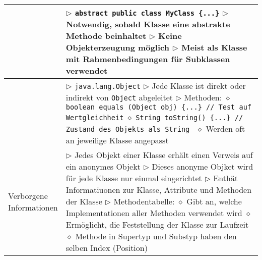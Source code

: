 \begin{longtable}{ | p{} p{} | }
	\makecell[l]{Abstraktion} & \makecell[l]{
	$\rhd$ \texttt{abstract public class MyClass \{...\}} \\
	$\rhd$ Notwendig, sobald Klasse eine abstrakte Methode beinhaltet \\
	$\rhd$ Keine Objekterzeugung möglich \\
	$\rhd$ Meist als Klasse mit Rahmenbedingungen für Subklassen verwendet }  \\ \hline
	
	\makecell[l]{Klasse aller Klassen} & \makecell[l]{
	$\rhd$ \texttt{java.lang.Object} \\
	$\rhd$ Jede Klasse ist direkt oder indirekt von \texttt{Object} abgeleitet \\
	$\rhd$ Methoden: \\
	\hspace{0.4cm} $\diamond$ \texttt{boolean equals (Object obj) \{...\} // Test auf Wertgleichheit} \\
	\hspace{0.4cm} $\diamond$ \texttt{String toString() \{...\} // Zustand des Objekts als String } \\
	\hspace{0.4cm} $\diamond$ Werden oft an jeweilige Klasse angepasst } \\ \hline
	
	\makecell[l]{Verborgene \\ Informationen} & \makecell[l]{
	$\rhd$ Jedes Objekt einer Klasse erhält einen Verweis auf ein anonymes Objekt \\
	$\rhd$ Dieses anonyme Objket wird für jede Klasse nur einmal eingerichtet \\
	$\rhd$ Enthät Informatiuonen zur Klasse, Attribute und Methoden der Klasse \\
	$\rhd$ Methodentabelle: \\
	\hspace{0.4cm} $\diamond$ Gibt an, welche Implementationen aller Methoden verwendet wird \\
	\hspace{0.4cm} $\diamond$ Ermöglicht, die Feststellung der Klasse zur Laufzeit \\
	\hspace{0.4cm} $\diamond$ Methode in Supertyp und Substyp haben den selben Index (Position) } \\ \hline


\end{longtable}

